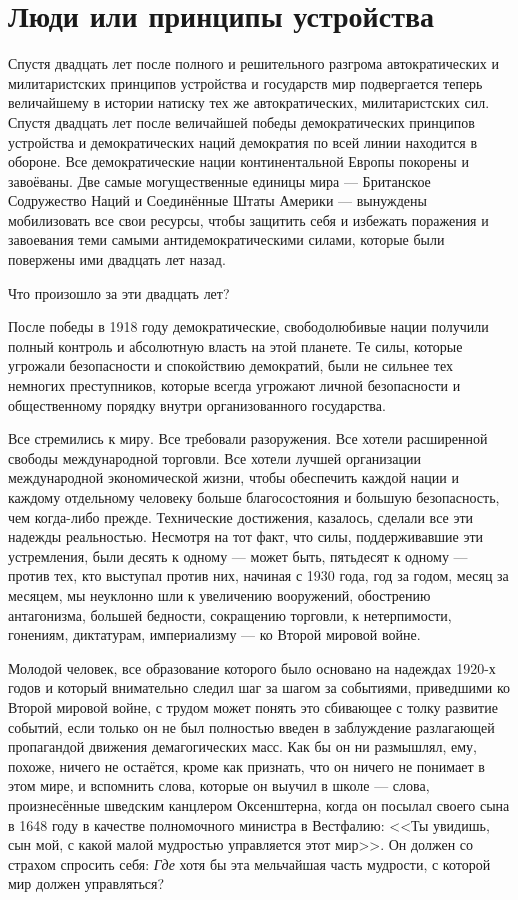 \chapter{Люди или принципы устройства}

\sloppy Спустя двадцать лет после полного и решительного разгрома автократических и милитаристских принципов устройства и государств мир подвергается теперь величайшему в истории натиску тех же автократических, милитаристских сил. Спустя двадцать лет после величайшей победы демократических принципов устройства и демократических наций демократия по всей линии находится в обороне. Все демократические нации континентальной Европы покорены и завоёваны. Две самые могущественные единицы мира — Британское Содружество Наций и Соединённые Штаты Америки — вынуждены мобилизовать все свои ресурсы, чтобы защитить себя и избежать поражения и завоевания теми самыми антидемократическими силами, которые были повержены ими двадцать лет назад.

Что произошло за эти двадцать лет?

После победы в 1918 году демократические, свободолюбивые нации получили полный контроль и абсолютную власть на этой планете. Те силы, которые угрожали безопасности и спокойствию демократий, были не сильнее тех немногих преступников, которые всегда угрожают личной безопасности и общественному порядку внутри организованного государства.

Все стремились к миру. Все требовали разоружения. Все хотели расширенной свободы международной торговли. Все хотели лучшей организации международной экономической жизни, чтобы обеспечить каждой нации и каждому отдельному человеку больше благосостояния и большую безопасность, чем когда-либо прежде. Технические достижения, казалось, сделали все эти надежды реальностью. Несмотря на тот факт, что силы, поддерживавшие эти устремления, были десять к одному — может быть, пятьдесят к одному — против тех, кто выступал против них, начиная с 1930 года, год за годом, месяц за месяцем, мы неуклонно шли к увеличению вооружений, обострению антагонизма, большей бедности, сокращению торговли, к нетерпимости, гонениям, диктатурам, империализму — ко Второй мировой войне.

Молодой человек, все образование которого было основано на надеждах 1920-х годов и который внимательно следил шаг за шагом за событиями, приведшими ко Второй мировой войне, с трудом может понять это сбивающее с толку развитие событий, если только он не был полностью введен в заблуждение разлагающей пропагандой движения демагогических масс. Как бы он ни размышлял, ему, похоже, ничего не остаётся, кроме как признать, что он ничего не понимает в этом мире, и вспомнить слова, которые он выучил в школе — слова, произнесённые шведским канцлером Оксенштерна, когда он посылал своего сына в 1648 году в качестве полномочного министра в Вестфалию: <<Ты увидишь, сын мой, с какой малой мудростью управляется этот мир>>. Он должен со страхом спросить себя: \textit{Где} хотя бы эта мельчайшая часть мудрости, с которой мир должен управляться?


